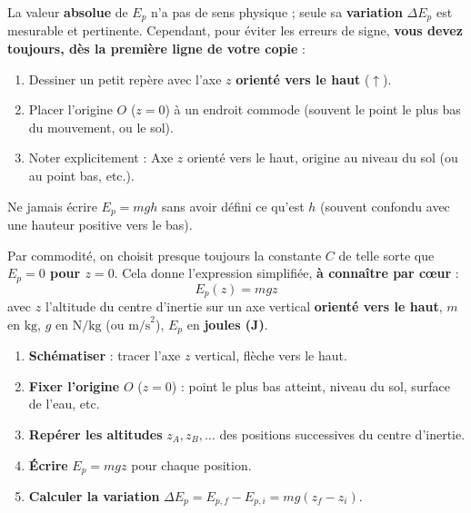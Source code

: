 \documentclass[11pt]{article}
\begin{document}
\begin{attention}
La valeur \textbf{absolue} de $E_p$ n'a pas de sens physique ; seule sa \textbf{variation} $\Delta E_p$ est mesurable et pertinente. Cependant, pour éviter les erreurs de signe, \textbf{vous devez toujours, dès la première ligne de votre copie} :
\begin{enumerate}
\item Dessiner un petit repère avec l'axe $z$ \textbf{orienté vers le haut} ($\uparrow$).
\item Placer l'origine $O$ ($z=0$) à un endroit commode (souvent le point le plus bas du mouvement, ou le sol).
\item Noter explicitement : \og Axe $z$ orienté vers le haut, origine au niveau du sol \fg (ou au point bas, etc.).
\end{enumerate}
Ne jamais écrire $E_p = mgh$ sans avoir défini ce qu'est $h$ (souvent confondu avec une hauteur positive vers le bas).
\end{attention}

\begin{propriete}
Par commodité, on choisit presque toujours la constante $C$ de telle sorte que \textbf{$E_p = 0$ pour $z = 0$}. Cela donne l'expression simplifiée, \textbf{à connaître par cœur} :
\[
\boxed{E_p(z) = mgz}
\]
avec $z$ l'altitude du centre d'inertie sur un axe vertical \textbf{orienté vers le haut}, $m$ en $\text{kg}$, $g$ en $\text{N/kg}$ (ou $\text{m/s}^2$), $E_p$ en \textbf{joules (J)}.
\end{propriete}

\begin{methode}
\begin{enumerate}
\item \textbf{Schématiser} : tracer l'axe $z$ vertical, flèche vers le haut.
\item \textbf{Fixer l'origine} $O$ ($z=0$) : point le plus bas atteint, niveau du sol, surface de l'eau, etc.
\item \textbf{Repérer les altitudes} $z_A, z_B, \dots$ des positions successives du centre d'inertie.
\item \textbf{Écrire} $E_p = mgz$ pour chaque position.
\item \textbf{Calculer la variation} $\Delta E_p = E_{p,f} - E_{p,i} = mg(z_f - z_i)$.
\end{enumerate}
\end{methode}
\end{document}
